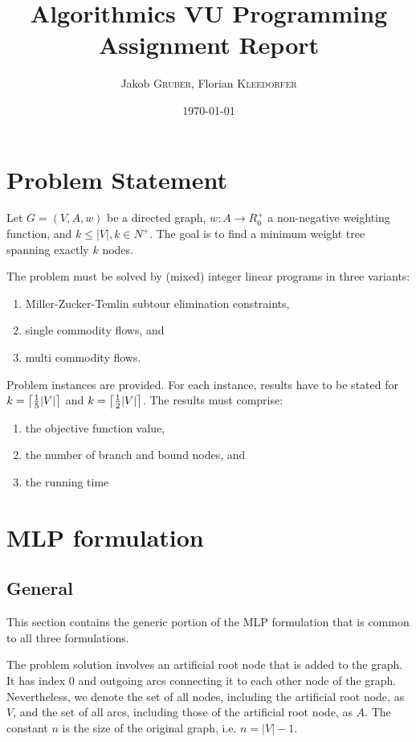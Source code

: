 \documentclass{article}
\title{Algorithmics VU Programming Assignment Report}
\author{Jakob \textsc{Gruber}, Florian \textsc{Kleedorfer}}
\date{\today}
\DeclarePairedDelimiter{\ceil}{\lceil}{\rceil}
\begin{document}
\maketitle

\section{Problem Statement}

Let $G=(V,A,w)$ be a directed graph, $w: A \rightarrow R_0^+$ a non-negative weighting function, and $k \leq |V|, k \in N^+$. The goal is to find a minimum weight tree spanning exactly $k$ nodes.

The problem must be solved by (mixed) integer linear programs in three variants:
\begin{enumerate}
	\item Miller-Zucker-Temlin subtour elimination constraints,
	\item single commodity flows, and
	\item multi commodity flows.
\end{enumerate}
Problem instances are provided. For each instance, results have to be stated for $k = \ceil[\big]{\frac{1}{5}|V|}$ and  $k = \ceil[\big]{\frac{1}{2}|V|}$. The results must comprise:
\begin{enumerate}
\item the objective function value,
\item the number of branch and bound nodes, and
\item the running time
\end{enumerate}

\section{MLP formulation} 
\subsection{General}
This section contains the generic portion of the MLP formulation that is common to all three formulations.

The problem solution involves an artificial root node that is added to the graph. It has index 0 and outgoing arcs connecting it to each other node of the graph. Nevertheless, we denote the set of all nodes, including the artificial root node, as $V$, and the set of all arcs, including those of the artificial root node, as $A$. The constant $n$ is the size of the original graph, i.e. $n = |V| - 1$.
\end{document}
